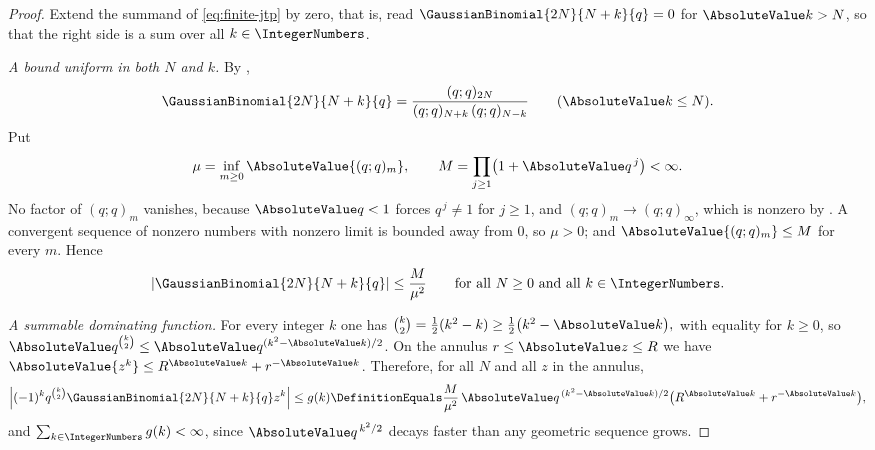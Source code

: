 \documentclass[11pt,a4paper,oneside,openany]{book}
\theoremstyle{definition}
\theoremstyle{remark}
\begin{document}
\begin{proof}
Extend the summand of \eqref{eq:finite-jtp} by zero, that is, read $\GaussianBinomial{2N}{N+k}{q}=0$ for $\AbsoluteValue k>N$, so that the right side is a sum over all $k\in\IntegerNumbers$.

\emph{A bound uniform in both $N$ and $k$.}  By ,
\[
 \GaussianBinomial{2N}{N+k}{q}
 =\frac{(q;q)_{2N}}{(q;q)_{N+k}\,(q;q)_{N-k}}
 \qquad(\AbsoluteValue k\le N).
\]
Put
\[
 \mu=\inf_{m\ge0}\AbsoluteValue{(q;q)_m},
 \qquad
 M=\prod_{j\ge1}\bigl(1+\AbsoluteValue q^{\,j}\bigr)<\infty .
\]
No factor of $(q;q)_m$ vanishes, because $\AbsoluteValue q<1$ forces $q^{\,j}\ne1$ for $j\ge1$, and $(q;q)_m\to(q;q)_\infty$, which is nonzero by .  A convergent sequence of nonzero numbers with nonzero limit is bounded away from $0$, so $\mu>0$; and $\AbsoluteValue{(q;q)_m}\le M$ for every $m$.  Hence
\begin{equation}
 \left|\GaussianBinomial{2N}{N+k}{q}\right|\le\frac{M}{\mu^{2}}
 \qquad\text{for all }N\ge0\text{ and all }k\in\IntegerNumbers .
 \label{eq:central-qbinom-uniform-bound}
\end{equation}

\emph{A summable dominating function.}  For every integer $k$ one has
\(
 \binom k2=\tfrac12(k^2-k)\ge\tfrac12\bigl(k^2-\AbsoluteValue k\bigr),
\)
with equality for $k\ge0$, so $\AbsoluteValue q^{\binom k2}\le\AbsoluteValue q^{(k^2-\AbsoluteValue k)/2}$.  On the annulus $r\le\AbsoluteValue z\le R$ we have $\AbsoluteValue{z^{k}}\le R^{\AbsoluteValue k}+r^{-\AbsoluteValue k}$.  Therefore, for all $N$ and all $z$ in the annulus,
\[
 \left|(-1)^kq^{\binom k2}\GaussianBinomial{2N}{N+k}{q}z^{k}\right|
 \le g(k)\DefinitionEquals
 \frac{M}{\mu^{2}}\,\AbsoluteValue q^{\,(k^2-\AbsoluteValue k)/2}
 \bigl(R^{\AbsoluteValue k}+r^{-\AbsoluteValue k}\bigr),
\]
and $\sum_{k\in\IntegerNumbers}g(k)<\infty$, since $\AbsoluteValue q^{\,k^2/2}$ decays faster than any geometric sequence grows.


\end{proof}
\end{document}
